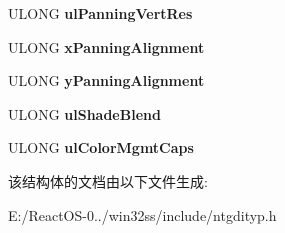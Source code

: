 \begin{DoxyCompactItemize}
U\+L\+O\+NG {\bfseries ul\+Panning\+Vert\+Res}
\item 
\mbox{\label{struct___d_e_v_c_a_p_s_a903fbc4170e0e3dbbc801f71e4a87dc5}} 
U\+L\+O\+NG {\bfseries x\+Panning\+Alignment}
\item 
\mbox{\label{struct___d_e_v_c_a_p_s_a6a65c23008e4d60740b1265b6397951d}} 
U\+L\+O\+NG {\bfseries y\+Panning\+Alignment}
\item 
\mbox{\label{struct___d_e_v_c_a_p_s_ae8115f89c2ab358a36461c2e4f03019c}} 
U\+L\+O\+NG {\bfseries ul\+Shade\+Blend}
\item 
\mbox{\label{struct___d_e_v_c_a_p_s_aa689a68c32ea4019177aa4a2090be660}} 
U\+L\+O\+NG {\bfseries ul\+Color\+Mgmt\+Caps}
\end{DoxyCompactItemize}


该结构体的文档由以下文件生成\+:\begin{DoxyCompactItemize}
\item 
E\+:/\+React\+O\+S-\/0../win32ss/include/ntgdityp.\+h\end{DoxyCompactItemize}
